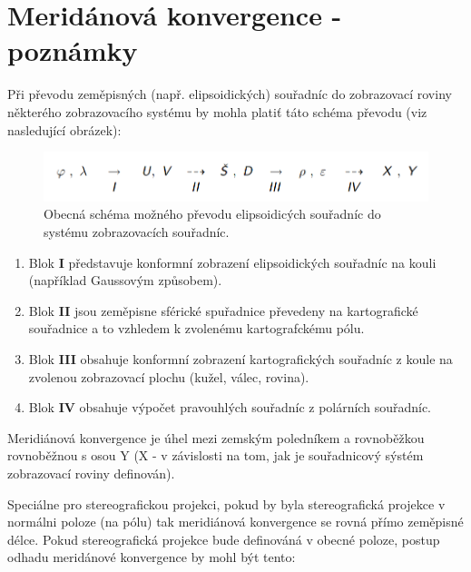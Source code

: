 \section{Meridánová konvergence - poznámky}

Při převodu zeměpisných (např. elipsoidických) souřadníc do zobrazovací roviny některého zobrazovacího systému by mohla platiť táto schéma převodu (viz nasledující obrázek):

\begin{figure}[ht!]
\begin{center}
\includegraphics[width=1\textwidth]{FIG/schema}
\caption{Obecná schéma možného převodu elipsoidicých souřadníc do systému zobrazovacích souřadníc.}
\label{fig:schema}
\end{center}
\end{figure}


\begin{enumerate}
\item Blok \textbf{I} představuje konformní zobrazení elipsoidických souřadníc na kouli (například Gaussovým způsobem).
\item Blok \textbf{II} jsou zeměpisne sférické spuřadnice převedeny na kartografické souřadnice a to vzhledem k zvolenému kartografckému pólu.
\item  Blok \textbf{III} obsahuje konformní zobrazení kartografických souřadníc z koule na zvolenou zobrazovací plochu (kužel, válec, rovina).
\item Blok \textbf{IV} obsahuje výpočet pravouhlých souřadníc z polárních souřadníc.
\end{enumerate}

Meridiánová konvergence je úhel mezi zemským poledníkem a rovnoběžkou rovnoběžnou s osou Y (X - v závislosti na tom, jak je souřadnicový sýstém zobrazovací roviny definován). 

Speciálne pro stereografickou projekci, pokud by byla stereografická projekce v normálni poloze (na pólu) tak meridiánová konvergence se rovná přímo zeměpisné délce. Pokud stereografická projekce bude definováná v obecné poloze, postup odhadu meridánové konvergence by mohl být tento: 

